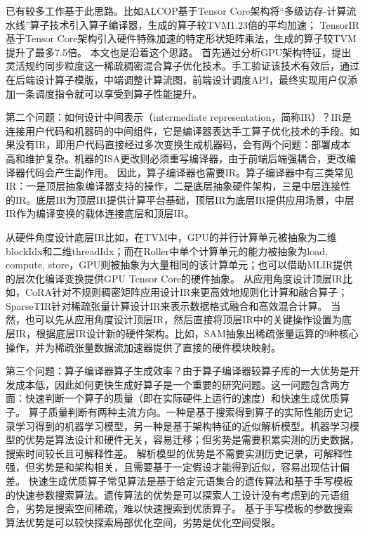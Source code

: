 已有较多工作基于此思路。比如ALCOP\cite{ALCOP}基于Tensor Core架构将“多级访存-计算流水线”算子技术引入算子编译器，生成的算子较TVM1.23倍的平均加速；
TensorIR\cite{TensorIR}基于Tensor Core架构引入硬件特殊加速的特定形状矩阵乘法，生成的算子较TVM提升了最多7.5倍。 本文也是沿着这个思路。
首先通过分析GPU架构特征，提出灵活规约同步粒度这一稀疏稠密混合算子优化技术。手工验证该技术有效后，通过在后端设计算子模版，中端调整计算流图，前端设计调度API，最终实现用户仅添加一条调度指令就可以享受到算子性能提升。

第二个问题：如何设计中间表示（intermediate representation，简称IR）？IR是连接用户代码和机器码的中间组件\cite{IR}，它是编译器表达手工算子优化技术的手段。如果没有IR，即用户代码直接经过多次变换生成机器码，会有两个问题：部署成本高和维护复杂。机器的ISA更改则必须重写编译器，由于前端后端强耦合，更改编译器代码会产生副作用\cite{LLVM}。
因此，算子编译器也需要IR。算子编译器中有三类常见IR：一是顶层抽象编译器支持的操作，二是底层抽象硬件架构，三是中层连接性的IR。底层IR为顶层IR提供计算平台基础，顶层IR为底层IR提供应用场景，中层IR作为编译变换的载体连接底层和顶层IR。

从硬件角度设计底层IR比如，在TVM\cite{tvm}中，GPU的并行计算单元被抽象为二维blockIdx和二维threadIdx；而在Roller\cite{Roller}中单个计算单元的能力被抽象为load, compute, store，GPU则被抽象为大量相同的该计算单元；也可以借助MLIR提供的层次化编译变换提供GPU Tensor Core的硬件抽象\cite{mlir-tc}。
从应用角度设计顶层IR比如，CoRA\cite{CoRA}针对不规则稠密矩阵应用设计IR来更高效地规则化计算和融合算子；SparseTIR\cite{SparseTIR}针对稀疏张量计算设计IR来表示数据格式融合和高效混合计算。
当然，也可以先从应用角度设计顶层IR，然后直接将顶层IR中的关键操作设置为底层IR，根据底层IR设计新的硬件架构。比如，SAM\cite{SAM}抽象出稀疏张量运算的9种核心操作，并为稀疏张量数据流加速器提供了直接的硬件模块映射。

第三个问题：算子编译器算子生成效率？由于算子编译器较算子库的一大优势是开发成本低，因此如何更快生成好算子是一个重要的研究问题。这一问题包含两方面：快速判断一个算子的质量（即在实际硬件上运行的速度）和快速生成优质算子。
算子质量判断有两种主流方向。一种是基于搜索得到算子的实际性能历史记录学习得到的机器学习模型，另一种是基于架构特征的近似解析模型。机器学习模型的优势是算法设计和硬件无关，容易迁移；但劣势是需要积累实测的历史数据，搜索时间较长且可解释性差\cite{AutoTVM,Ansor,AMOS}。
解析模型的优势是不需要实测历史记录，可解释性强，但劣势是和架构相关，且需要基于一定假设才能得到近似，容易出现估计偏差\cite{GNNAdvisor,Roller,ALCOP}。
快速生成优质算子常见算法是基于给定元语集合的遗传算法和基于手写模板的快速参数搜索算法。遗传算法的优势是可以探索人工设计没有考虑到的元语组合，劣势是搜索空间稀疏，难以快速搜索到优质算子\cite{Hidet}。
基于手写模板的参数搜索算法优势是可以较快探索局部优化空间，劣势是优化空间受限\cite{Auto-Halide}。

